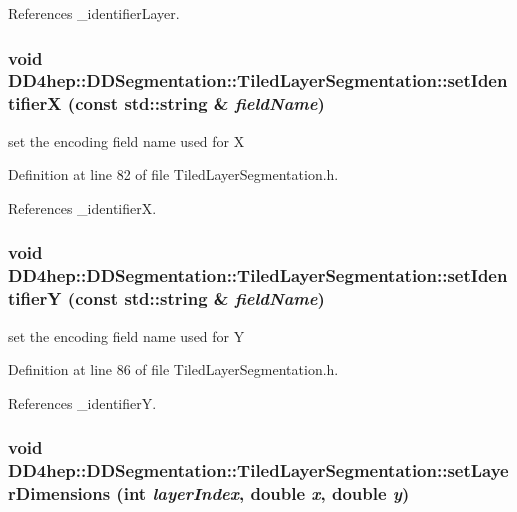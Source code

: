 References \_\-identifierLayer.\hypertarget{class_d_d4hep_1_1_d_d_segmentation_1_1_tiled_layer_segmentation_adab12f13ca0d94e18e8d2ef82c8115cb}{
\subsubsection[{setIdentifierX}]{\setlength{\rightskip}{0pt plus 5cm}void DD4hep::DDSegmentation::TiledLayerSegmentation::setIdentifierX (const std::string \& {\em fieldName})}}
\label{class_d_d4hep_1_1_d_d_segmentation_1_1_tiled_layer_segmentation_adab12f13ca0d94e18e8d2ef82c8115cb}


set the encoding field name used for X 

Definition at line 82 of file TiledLayerSegmentation.h.

References \_\-identifierX.\hypertarget{class_d_d4hep_1_1_d_d_segmentation_1_1_tiled_layer_segmentation_ab9a0cd946f996399d9cabfecc4223abd}{
\subsubsection[{setIdentifierY}]{\setlength{\rightskip}{0pt plus 5cm}void DD4hep::DDSegmentation::TiledLayerSegmentation::setIdentifierY (const std::string \& {\em fieldName})}}
\label{class_d_d4hep_1_1_d_d_segmentation_1_1_tiled_layer_segmentation_ab9a0cd946f996399d9cabfecc4223abd}


set the encoding field name used for Y 

Definition at line 86 of file TiledLayerSegmentation.h.

References \_\-identifierY.\hypertarget{class_d_d4hep_1_1_d_d_segmentation_1_1_tiled_layer_segmentation_a579736d34689d340d8d4dba0b30da4ba}{
\subsubsection[{setLayerDimensions}]{\setlength{\rightskip}{0pt plus 5cm}void DD4hep::DDSegmentation::TiledLayerSegmentation::setLayerDimensions (int {\em layerIndex}, \/  double {\em x}, \/  double {\em y})}}
\label{class_d_d4hep_1_1_d_d_segmentation_1_1_tiled_layer_segmentation_a579736d34689d340d8d4dba0b30da4ba}


